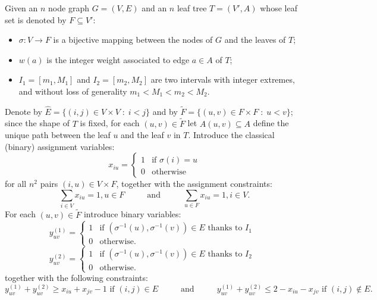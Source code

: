 \documentclass{fundam}
\begin{document}
\medskip
Given an $n$ node graph $G = (V, E)$ and an $n$ leaf tree $T=(V', A)$ whose leaf set is denoted by $F \subseteq V'$:
\begin{itemize}
\item $\sigma: V \to F$ is a bijective mapping between the nodes of $G$ and the leaves of $T$;
\item $w(a)$ is the integer weight associated to edge $a \in A$ of $T$;
\item $I_1=[m_1, M_1]$ and $I_2=[m_2, M_2]$ are two intervals with integer extremes, and without loss of generality $m_1 < M_1 < m_2 < M_2$.
\end{itemize}
Denote by $\hat{E} = \{ (i, j) \in V \times V \;:\; i < j \}$ and by $\tilde{F} = \{ (u, v) \in F \times F \;:\; u < v \}$;
since the shape of $T$ is fixed, for each $(u,v) \in \tilde{F}$ let $A(u,v) \subseteq A$ define the unique path between the leaf $u$ and the leaf $v$ in $T$.
Introduce the classical (binary) assignment variables:
\[
 x_{iu} =
 \left\{\begin{array}{ll}
         1 & \mbox{if } \sigma(i)=u\\[0.1cm]
         0 & \mbox{otherwise}
        \end{array}\right.
\]
for all $n^2$ pairs $(i,u) \in V \times F$, together with the assignment constraints:
\begin{equation}
 \textstyle
 \sum_{i \in V} x_{iu} = 1, u \in F \hspace{1cm} \mbox{ and } \hspace{1cm}
 \sum_{u \in F} x_{iu} = 1, i \in V.
 \label{eq:ass}
\end{equation}
For each $(u,v) \in \tilde{F}$ introduce binary variables:
\[
 y^{(1)}_{uv} =
 \left\{\begin{array}{ll}
         1 & \mbox{if } (\sigma^{-1}(u),\sigma^{-1}(v)) \in E \mbox{ thanks to }I_1 \\[0.1cm]
         0 & \mbox{otherwise.}
        \end{array}\right.
 \;\;
\]
\[
 y^{(2)}_{uv} =
 \left\{\begin{array}{ll}
         1 & \mbox{if } (\sigma^{-1}(u),\sigma^{-1}(v)) \in E \mbox{ thanks to }I_2 \\[0.1cm]
         0 & \mbox{otherwise.}
        \end{array}\right.
 \;\;
\]
together with the following constraints:
\begin{equation}
 \textstyle
 y^{(1)}_{uv}+y^{(2)}_{uv} \geq x_{iu} + x_{jv} - 1 \mbox{ if } (i,j) \in E \hspace{1cm} \mbox{ and } \hspace{1cm}
 y^{(1)}_{uv}+y^{(2)}_{uv} \leq 2 - x_{iu} - x_{jv}
 \mbox{ if } (i,j) \notin E.
\end{equation}
\end{document}
